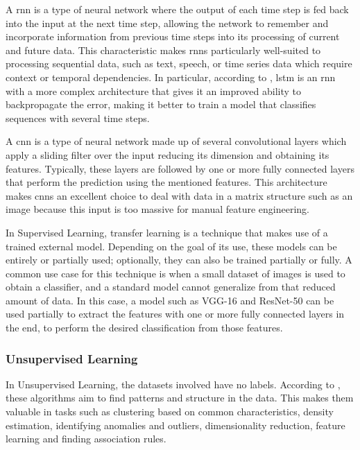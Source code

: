 A \acf{rnn} is a type of neural network where the output of each time step is fed back into the input at the next time step, allowing the network to remember and incorporate information from previous time steps into its processing of current and future data. This characteristic makes \acp{rnn} particularly well-suited to processing sequential data, such as text, speech, or time series data which require context or temporal dependencies. In particular, according to \cite{lstm_advantages}, \acf{lstm} is an \acs{rnn} with a more complex architecture that gives it an improved ability to backpropagate the error, making it better to train a model that classifies sequences with several time steps.

A \acf{cnn} is a type of neural network made up of several convolutional layers which apply a sliding filter over the input reducing its dimension and obtaining its features. Typically, these layers are followed by one or more fully connected layers that perform the prediction using the mentioned features. This architecture makes \acp{cnn} an excellent choice to deal with data in a matrix structure such as an image because this input is too massive for manual feature engineering.

In Supervised Learning, transfer learning is a technique that makes use of a trained external model. Depending on the goal of its use, these models can be entirely or partially used; optionally, they can also be trained partially or fully. A common use case for this technique is when a small dataset of images is used to obtain a classifier, and a standard model cannot generalize from that reduced amount of data. In this case, a model such as VGG-16 and ResNet-50 can be used partially to extract the features with one or more fully connected layers in the end, to perform the desired classification from those features.

\subsubsection{Unsupervised Learning}


In Unsupervised Learning, the datasets involved have no labels. According to \textcite{Sarker2021}, these algorithms aim to find patterns and structure in the data. This makes them valuable in tasks such as clustering based on common characteristics, density estimation, identifying anomalies and outliers, dimensionality reduction, feature learning and finding association rules.

